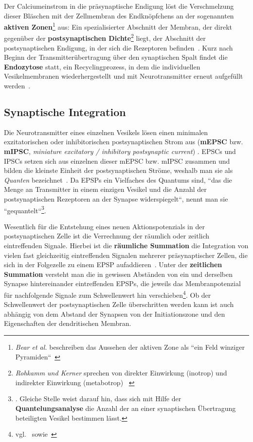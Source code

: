 {{Der Calciumeinstrom in die präsynaptische Endigung löst die Verschmelzung dieser Bläschen mit der Zellmembran des Endknöpfchens an der sogenannten \textbf{aktiven Zonen}\footnote{
 \textit{Bear et al.} beschreiben das Aussehen der aktiven Zone als ``ein Feld winziger Pyramiden``~\cite[123]{BCP18}
} aus: Ein spezialisierter Abschnitt der Membran, der direkt gegenüber der \textbf{postsynaptischen Dichte}\footnote{
 \textit{Rohkamm und Kerner} sprechen von direkter Einwirkung (inotrop) und indirekter Einwirkung (metabotrop) ~\cite[134]{RK18}
} liegt, der Abschnitt der postsynaptischen Endigung, in der sich die Rezeptoren befinden~\cite[96]{HS19a}.
Kurz nach Beginn der Transmitterübertragung über den synaptischen Spalt findet die \textbf{Endozytose} statt, ein Recyclingprozess, in dem die individuellen Vesikelmembranen wiederhergestellt und mit Neurotransmitter erneut aufgefüllt werden~\cite[133]{BCP18}.


\subsection{Synaptische Integration}

Die Neurotransmitter eines einzelnen Vesikels lösen einen minimalen exzitatorischen oder inhibitorischen postsynaptischen Strom aus (\textbf{mEPSC} bzw. \textbf{mIPSC}, \textit{miniature excitatory / inhibitory postsynaptic current}) . 
EPSCs und IPSCs setzen sich aus einzelnen dieser mEPSC bzw. mIPSC zusammen und bilden die kleinste Einheit der postsynaptischen Ströme, weshalb man sie als \textit{Quanten} bezeichnet~\cite[98]{HS19a}.
Da EPSPs ein Vielfaches des Quantums sind, ``das die Menge an Transmitter in einem einzigen Vesikel und die Anzahl der postsynaptischen Rezeptoren an der Synapse widerspiegelt``, nennt man sie ``gequantelt``\footnote{
 \cite[142]{BCP18}. Gleiche Stelle weist darauf hin, dass sich mit Hilfe der \textbf{Quantelungsanalyse} die Anzahl der an einer synaptischen Übertragung beteiligten Vesikel bestimmen lässt.
}.

Wesentlich für die Entstehung eines neuen Aktionspotenzials in der postsynaptischen Zelle ist die Verrechnung der räumlich oder zeitlich eintreffenden Signale. 
Hierbei ist die \textbf{räumliche Summation} die Integration von vielen fast gleichzeitig eintreffenden Signalen mehrerer präsynaptischer Zellen, die sich in der Folgezelle zu einem EPSP aufaddieren~\cite[101]{HS19a}.
Unter der \textbf{zeitlichen Summation} versteht man die in gewissen Abständen von ein und derselben Synapse hintereinander eintreffenden EPSPs, die jeweils  das Membranpotenzial für nachfolgende Signale zum Schwellenwert hin verschieben\footnote{
 vgl.~\cite[142]{BCP18} sowie~\cite[101]{HS19a}
}.
Ob der Schwellenwert der postsynaptischen Zelle überschritten werden kann ist auch abhängig von dem Abstand der Synapsen von der Initiationszone und den Eigenschaften der dendritischen Membran.

}}
